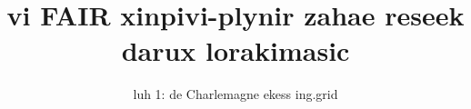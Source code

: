 

\title{vi FAIR xinpivi-plynir zahae reseek darux lorakimasic}
\subtitle{luh 1: de Charlemagne ekess ing.grid}

